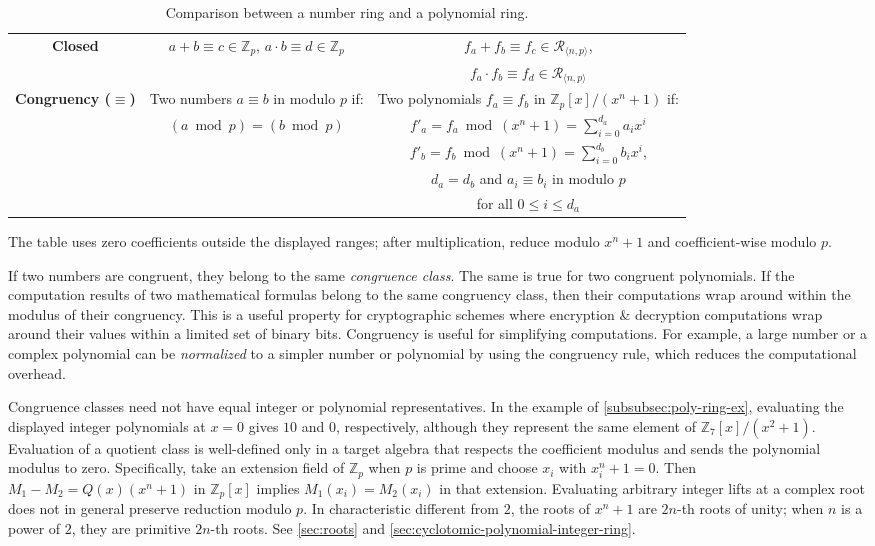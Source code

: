\begin{table}[h]
\begin{tabular}{|c||c|c|}
\textbf{{Closed}}& $a + b \equiv c \in \mathbb{Z}_p$, $a \cdot b \equiv d \in \mathbb{Z}_p$ & $f_a + f_b \equiv f_c \in \mathcal{R}_{\langle n, p \rangle}$, \\
&&$f_a \cdot f_b \equiv f_d \in \mathcal{R}_{\langle n, p \rangle}$\\
\hline
\textbf{{Congruency ($\equiv$)}} & Two numbers $a \equiv b$ in modulo $p$ if: & Two polynomials $f_a \equiv f_b$ in $\mathbb{Z}_p[x] / (x^n + 1)$ if:    \\
 & $(a \bmod p) = (b \bmod p)$   & $f'_a = f_a \bmod (x^n + 1) = \sum\limits_{i=0}^{d_a} a_ix^i$ \\
 & & $f'_b = f_b \bmod (x^n + 1) = \sum\limits_{i=0}^{d_b} b_ix^i$, \\
&& $d_a = d_b$ and $a_i \equiv b_i$ in modulo $p$\\
&&for all $0 \leq i \leq d_a$\\ 
\hline
\end{tabular}%
\centering
\caption{Comparison between a number ring and a polynomial ring.
}
\label{tab:ring-comparison}

The table uses zero coefficients outside the displayed ranges; after multiplication, reduce modulo $x^n+1$ and coefficient-wise modulo $p$.
\end{table}

 If two numbers are congruent, they belong to the same \textit{congruence class}. The same is true for two congruent polynomials. If the computation results of two mathematical formulas belong to the same congruency class, then their computations wrap around within the modulus of their congruency. This is a useful property for cryptographic schemes where encryption \& decryption computations wrap around their values within a limited set of binary bits. Congruency is useful for simplifying computations. For example, a large number or a complex polynomial can be \textit{normalized} to a simpler number or polynomial by using the congruency rule, which reduces the computational overhead. 

 Congruence classes need not have equal integer or polynomial representatives. In the example of \autoref{subsubsec:poly-ring-ex}, evaluating the displayed integer polynomials at $x=0$ gives $10$ and $0$, respectively, although they represent the same element of $\mathbb{Z}_7[x]/(x^2+1)$. Evaluation of a quotient class is well-defined only in a target algebra that respects the coefficient modulus and sends the polynomial modulus to zero. Specifically, take an extension field of $\mathbb{Z}_p$ when $p$ is prime and choose $x_i$ with $x_i^n+1=0$. Then $M_1-M_2=Q(x)(x^n+1)$ in $\mathbb{Z}_p[x]$ implies $M_1(x_i)=M_2(x_i)$ in that extension. Evaluating arbitrary integer lifts at a complex root does not in general preserve reduction modulo $p$. In characteristic different from $2$, the roots of $x^n+1$ are $2n$-th roots of unity; when $n$ is a power of $2$, they are primitive $2n$-th roots. See \autoref{sec:roots} and \autoref{sec:cyclotomic-polynomial-integer-ring}.

